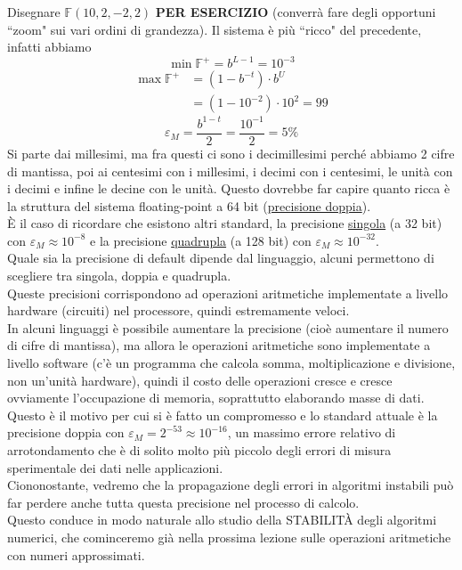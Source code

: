 \begin{esempio} \end{esempio}
Disegnare $\mathbb{F}(10, 2, -2, 2)$ \textbf{PER ESERCIZIO} (converrà fare degli opportuni ``zoom" sui vari ordini di grandezza). Il sistema è più ``ricco" del precedente, infatti abbiamo
\[ \min \mathbb{F}^+ = b^{L-1} = 10^{-3} \]
\[\begin{split}
    \max \mathbb{F}^+ & = (1 - b^{-t}) \cdot b^U \\
    & = (1 - 10^{-2}) \cdot 10^2 = 99
\end{split}\]
\[ \varepsilon_M = \frac{b^{1-t}}{2} = \frac{10^{-1}}{2} = 5\% \]
Si parte dai millesimi, ma fra questi ci sono i decimillesimi perché abbiamo 2 cifre di mantissa, poi ai centesimi con i millesimi, i decimi con i centesimi, le unità con i decimi e infine le decine con le unità.
\newline \newline
Questo dovrebbe far capire quanto ricca è la struttura del sistema floating-point a 64 bit (\uline{precisione doppia}). \\
È il caso di ricordare che esistono altri standard, la precisione \uline{singola} (a 32 bit) con $\varepsilon_M \approx 10^{-8}$ e la precisione \uline{quadrupla} (a 128 bit) con $\varepsilon_M \approx 10^{-32}$.\\
Quale sia la precisione di default dipende dal linguaggio, alcuni permettono di scegliere tra singola, doppia e quadrupla. \\
Queste precisioni corrispondono ad operazioni aritmetiche implementate a livello hardware (circuiti) nel processore, quindi estremamente veloci. \\
In alcuni linguaggi è possibile aumentare la precisione (cioè aumentare il numero di cifre di mantissa), ma allora le operazioni aritmetiche sono implementate a livello software (c'è un programma che calcola somma, moltiplicazione e divisione, non un'unità hardware), quindi il costo delle operazioni cresce e cresce ovviamente l'occupazione di memoria, soprattutto elaborando masse di dati. \\
Questo è il motivo per cui si è fatto un compromesso e lo standard attuale è la precisione doppia con $\varepsilon_M = 2^{-53} \approx 10^{-16}$, un massimo errore relativo di arrotondamento che è di solito molto più piccolo degli errori di misura sperimentale dei dati nelle applicazioni.\\
Ciononostante, vedremo che la propagazione degli errori in algoritmi instabili può far perdere anche tutta questa precisione nel processo di calcolo. \\
Questo conduce in modo naturale allo studio della STABILITÀ degli algoritmi numerici, che cominceremo già nella prossima lezione sulle operazioni aritmetiche con numeri approssimati.
\newpage